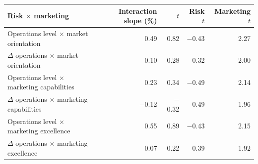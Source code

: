 \begin{tabular}{lrrrr}
\toprule
Risk $\times$ marketing & Interaction slope (\%) & $t$ & Risk $t$ & Marketing $t$ \\
\midrule
Operations level $\times$ market orientation & 0.49 & 0.82 & \ensuremath{-}0.43 & 2.27 \\
$\Delta$ operations $\times$ market orientation & 0.10 & 0.28 & 0.32 & 2.00 \\
Operations level $\times$ marketing capabilities & 0.23 & 0.34 & \ensuremath{-}0.49 & 2.14 \\
$\Delta$ operations $\times$ marketing capabilities & \ensuremath{-}0.12 & \ensuremath{-}0.32 & 0.49 & 1.96 \\
Operations level $\times$ marketing excellence & 0.55 & 0.89 & \ensuremath{-}0.43 & 2.15 \\
$\Delta$ operations $\times$ marketing excellence & 0.07 & 0.22 & 0.39 & 1.92 \\
\bottomrule
\end{tabular}
